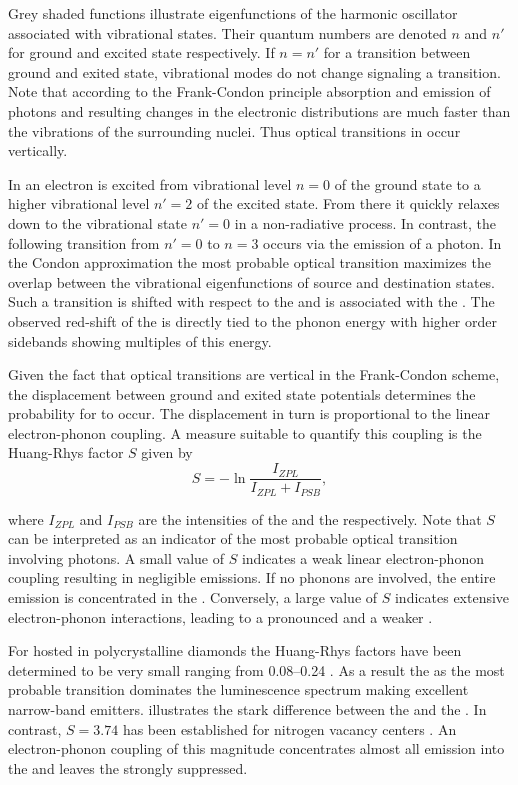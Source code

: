     Grey shaded functions illustrate eigenfunctions of the harmonic oscillator associated with vibrational states. Their quantum numbers are denoted $n$ and $n'$ for ground and excited state respectively. If $n = n'$ for a transition between ground and exited state, vibrational modes do not change signaling a \zpl transition. Note that according to the Frank-Condon principle \cite{condon1947franck} absorption and emission of photons and resulting changes in the electronic distributions are much faster than the vibrations of the surrounding nuclei. Thus optical transitions in  occur vertically. 

    In  an electron is excited from vibrational level $n=0$ of the ground state to a higher vibrational level $n'= 2$ of the excited state. From there it quickly relaxes down to the vibrational state $n' = 0$ in a non-radiative process. In contrast, the following transition from $n'=0$ to $n=3$ occurs via the emission of a photon. In the Condon approximation the most probable optical transition maximizes the overlap between the vibrational eigenfunctions of source and destination states. Such a transition is shifted with respect to the \ZPL and is associated with the \psb. The observed red-shift of the \psb is directly tied to the phonon energy with higher order sidebands showing multiples of this energy.

    Given the fact that optical transitions are vertical in the Frank-Condon scheme, the displacement between ground and exited state potentials determines the probability for \psbs to occur. The displacement in turn is proportional to the linear electron-phonon coupling. A measure suitable to quantify this coupling is the Huang-Rhys factor $S$ given by
     \begin{equation}
        S = -\ln{\frac{I_{ZPL}}{I_{ZPL} + I_{PSB}}} ,
     \end{equation}

    where $I_{ZPL}$ and $I_{PSB}$ are the intensities of the \ZPL and the \psb respectively. Note that $S$ can be interpreted as an indicator of the most probable optical transition involving photons. A small value of $S$ indicates a weak linear electron-phonon coupling resulting in negligible \psb emissions. If no phonons are involved, the entire emission is concentrated in the \zpl. Conversely, a large value of $S$ indicates extensive electron-phonon interactions, leading to a pronounced \psb and a weaker \zpl.

    For \sivs hosted in polycrystalline diamonds the Huang-Rhys factors have been determined to be very small ranging from \SIrange{0.08}{0.24}{} \cite{Duligall2006,Yuan2002,Nothaft2012}. As a result the \zpl as the most probable transition dominates the luminescence spectrum making \sivs excellent narrow-band emitters.  illustrates the stark difference between the \zpl and the \psb. In contrast, $S=3.74$ has been established for nitrogen vacancy centers \cite{Davies1981}. An electron-phonon coupling of this magnitude concentrates almost all emission into the \psb and leaves the \zpl strongly suppressed.

